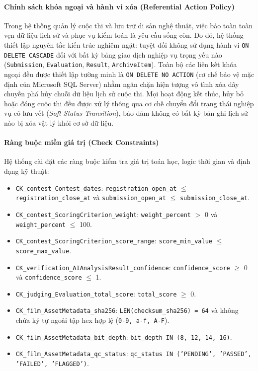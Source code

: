 \paragraph{Chính sách khóa ngoại và hành vi xóa (Referential Action Policy)}
Trong hệ thống quản lý cuộc thi và lưu trữ di sản nghệ thuật, việc bảo toàn toàn vẹn dữ liệu lịch sử và phục vụ kiểm toán là yêu cầu sống còn. Do đó, hệ thống thiết lập nguyên tắc kiến trúc nghiêm ngặt: tuyệt đối không sử dụng hành vi \texttt{ON DELETE CASCADE} đối với bất kỳ bảng giao dịch nghiệp vụ trọng yếu nào (\texttt{Submission}, \texttt{Evaluation}, \texttt{Result}, \texttt{ArchiveItem}). Toàn bộ các liên kết khóa ngoại đều được thiết lập tường minh là \texttt{ON DELETE NO ACTION} (cơ chế bảo vệ mặc định của Microsoft SQL Server) nhằm ngăn chặn hiện tượng vô tình xóa dây chuyền phá hủy chuỗi dữ liệu lịch sử cuộc thi. Mọi hoạt động kết thúc, hủy bỏ hoặc đóng cuộc thi đều được xử lý thông qua cơ chế chuyển đổi trạng thái nghiệp vụ có lưu vết (\textit{Soft Status Transition}), bảo đảm không có bất kỳ bản ghi lịch sử nào bị xóa vật lý khỏi cơ sở dữ liệu.

\paragraph{Ràng buộc miền giá trị (Check Constraints)}
Hệ thống cài đặt các ràng buộc kiểm tra giá trị toán học, logic thời gian và định dạng kỹ thuật:
\begin{itemize}
    \item \texttt{CK\_contest\_Contest\_dates}: \texttt{registration\_open\_at} $\leq$ \texttt{registration\_close\_at} và \texttt{submission\_open\_at} $\leq$ \texttt{submission\_close\_at}.
    \item \texttt{CK\_contest\_ScoringCriterion\_weight}: \texttt{weight\_percent} $>$ 0 và \texttt{weight\_percent} $\leq$ 100.
    \item \texttt{CK\_contest\_ScoringCriterion\_score\_range}: \texttt{score\_min\_value} $\leq$ \texttt{score\_max\_value}.
    \item \texttt{CK\_verification\_AIAnalysisResult\_confidence}: \texttt{confidence\_score} $\geq$ 0 và \texttt{confidence\_score} $\leq$ 1.
    \item \texttt{CK\_judging\_Evaluation\_total\_score}: \texttt{total\_score} $\geq$ 0.
    \item \texttt{CK\_film\_AssetMetadata\_sha256}: \texttt{LEN(checksum\_sha256) = 64} và không chứa ký tự ngoài tập hex hợp lệ (\texttt{0-9, a-f, A-F}).
    \item \texttt{CK\_film\_AssetMetadata\_bit\_depth}: \texttt{bit\_depth IN (8, 12, 14, 16)}.
    \item \texttt{CK\_film\_AssetMetadata\_qc\_status}: \texttt{qc\_status IN ('PENDING', 'PASSED', 'FAILED', 'FLAGGED')}.
\end{itemize}

